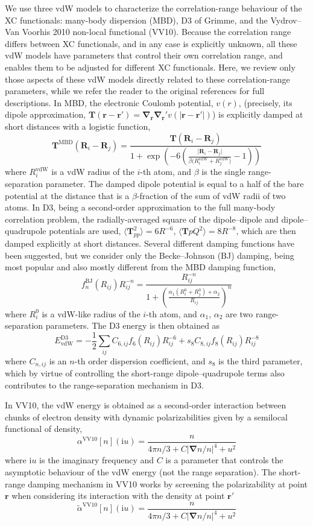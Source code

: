 We use three vdW models to characterize the correlation-range behaviour of the XC functionals: many-body dispersion (MBD), D3 of Grimme, and the Vydrov--Van Voorhis 2010 non-local functional (VV10).
Because the correlation range differs between XC functionals, and in any case is explicitly unknown, all these vdW models have parameters that control their own correlation range, and enables them to be adjusted for different XC functionals.
Here, we review only those aspects of these vdW models directly related to these correlation-range parameters, while we refer the reader to the original references for full descriptions.
In MBD, the electronic Coulomb potential, $v(r)$, (precisely, its dipole approximation, $\mathbf T(\mathbf r-\mathbf r')=\boldsymbol\nabla_\mathbf r\boldsymbol\nabla_\mathbf r'v(\lvert\mathbf r-\mathbf r'\rvert)$) is explicitly damped at short distances with a logistic function,
$$
  \mathbf T^\text{MBD}(\mathbf R_i-\mathbf R_j)=\frac{\mathbf T(\mathbf R_i-\mathbf R_j)}{1+\exp\left(-6\left(\frac{\lvert\mathbf R_i-\mathbf R_j\rvert}{\beta\big(R_i^\text{vdW}+R_j^\text{vdW}\big )}-1\right)\!\!\right)}
$$
where $R_i^\text{vdW}$ is a vdW radius of the $i$-th atom, and $\beta$ is the single range-separation parameter.
The damped dipole potential is equal to a half of the bare potential at the distance that is a $\beta$-fraction of the sum of vdW radii of two atoms.
In D3, being a second-order approximation to the full many-body correlation problem, the radially-averaged square of the dipole--dipole and dipole--quadrupole potentials are used, $\langle\mathbf T_{pp}^2\rangle=6R^{-6}$, $\langle\mathbf T{pQ}^2\rangle=8R^{-8}$, which are then damped explicitly at short distances.
Several different damping functions have been suggested, but we consider only the Becke--Johnson (BJ) damping, being most popular and also mostly different from the MBD damping function,
$$
  f_n^\text{BJ}(R_{ij})R_{ij}^{-n}=\frac{R_{ij}^{-n}}{1+\left(\frac{\alpha_1(R^0_i+R^0_j)+\alpha_2}{R_{ij}}\right)^n}
$$
where $R^0_i$ is a vdW-like radius of the $i$-th atom, and $\alpha_1$, $\alpha_2$ are two range-separation parameters.
The D3 energy is then obtained as
$$
E^\text{D3}_\text{vdW}=-\frac12\sum_{ij}C_{6,ij}f_6(R_{ij})R_{ij}^{-6}+s_8C_{8,ij}f_8(R_{ij})R_{ij}^{-8}
$$
where $C_{n,ij}$ is an $n$-th order dispersion coefficient, and $s_8$ is the third parameter, which by virtue of controlling the short-range dipole--quadrupole terms also contributes to the range-separation mechanism in D3.

In VV10, the vdW energy is obtained as a second-order interaction between chunks of electron density with dynamic polarizabilities given by a semilocal functional of density,
$$
\alpha^\text{VV10}[n](\mathrm iu)=\frac n{4\pi n/3+C\lvert\boldsymbol\nabla n/n\rvert^4+u^2}
$$
where $\mathrm iu$ is the imaginary frequency and $C$ is a parameter that controls the asymptotic behaviour of the vdW energy (not the range separation).
The short-range damping mechanism in VV10 works by screening the polarizability at point $\mathbf r$ when considering its interaction with the density at point $\mathbf r'$
$$
\tilde\alpha^\text{VV10}[n](\mathrm iu)=\frac n{4\pi n/3+C\lvert\boldsymbol\nabla n/n\rvert^4+u^2}
$$






